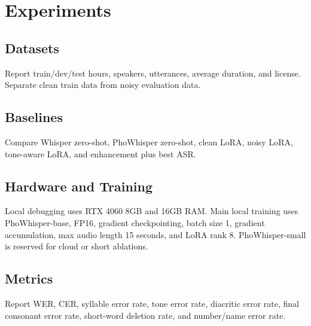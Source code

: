 \section{Experiments}
\subsection{Datasets}
Report train/dev/test hours, speakers, utterances, average duration, and license. Separate clean train data from noisy evaluation data.

\subsection{Baselines}
Compare Whisper zero-shot, PhoWhisper zero-shot, clean LoRA, noisy LoRA, tone-aware LoRA, and enhancement plus best ASR.

\subsection{Hardware and Training}
Local debugging uses RTX 4060 8GB and 16GB RAM. Main local training uses PhoWhisper-base, FP16, gradient checkpointing, batch size 1, gradient accumulation, max audio length 15 seconds, and LoRA rank 8. PhoWhisper-small is reserved for cloud or short ablations.

\subsection{Metrics}
Report WER, CER, syllable error rate, tone error rate, diacritic error rate, final consonant error rate, short-word deletion rate, and number/name error rate.
